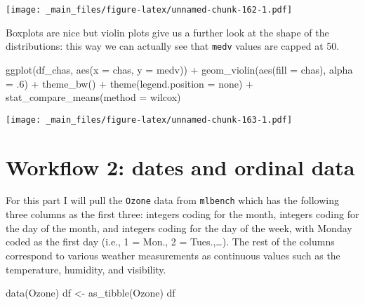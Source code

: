 \documentclass[
]{book}
\newenvironment{Shaded}{\begin{snugshade}}{\end{snugshade}}
\newcommand{\AttributeTok}[1]{\textcolor[rgb]{0.77,0.63,0.00}{#1}}
\newcommand{\DecValTok}[1]{\textcolor[rgb]{0.00,0.00,0.81}{#1}}
\newcommand{\FunctionTok}[1]{\textcolor[rgb]{0.00,0.00,0.00}{#1}}
\newcommand{\NormalTok}[1]{#1}
\newcommand{\OtherTok}[1]{\textcolor[rgb]{0.56,0.35,0.01}{#1}}
\newcommand{\SpecialCharTok}[1]{\textcolor[rgb]{0.00,0.00,0.00}{#1}}
\newcommand{\StringTok}[1]{\textcolor[rgb]{0.31,0.60,0.02}{#1}}
\begin{document}
\texttt{[image: \_main\_files/figure-latex/unnamed-chunk-162-1.pdf]}

Boxplots are nice but violin plots give us a further look at the shape of the distributions: this way we can actually see that \texttt{medv} values are capped at 50.

\begin{Shaded}
\begin{Highlighting}[]
\FunctionTok{ggplot}\NormalTok{(df\_chas, }\FunctionTok{aes}\NormalTok{(}\AttributeTok{x =}\NormalTok{ chas, }\AttributeTok{y =}\NormalTok{ medv)) }\SpecialCharTok{+}
  \FunctionTok{geom\_violin}\NormalTok{(}\FunctionTok{aes}\NormalTok{(}\AttributeTok{fill =}\NormalTok{ chas), }\AttributeTok{alpha =}\NormalTok{ .}\DecValTok{6}\NormalTok{) }\SpecialCharTok{+} 
  \FunctionTok{theme\_bw}\NormalTok{() }\SpecialCharTok{+} \FunctionTok{theme}\NormalTok{(}\AttributeTok{legend.position =} \StringTok{\textquotesingle{}none\textquotesingle{}}\NormalTok{) }\SpecialCharTok{+}
  \FunctionTok{stat\_compare\_means}\NormalTok{(}\AttributeTok{method =} \StringTok{\textquotesingle{}wilcox\textquotesingle{}}\NormalTok{)}
\end{Highlighting}
\end{Shaded}

\texttt{[image: \_main\_files/figure-latex/unnamed-chunk-163-1.pdf]}

\hypertarget{workflow-2-dates-and-ordinal-data}{%
\section{Workflow 2: dates and ordinal data}\label{workflow-2-dates-and-ordinal-data}}

For this part I will pull the \texttt{Ozone} data from \texttt{mlbench} which has the following three columns as the first three: integers coding for the month, integers coding for the day of the month, and integers coding for the day of the week, with Monday coded as the first day (i.e., 1 = Mon., 2 = Tues.,\ldots). The rest of the columns correspond to various weather measurements as continuous values such as the temperature, humidity, and visibility.

\begin{Shaded}
\begin{Highlighting}[]
\FunctionTok{data}\NormalTok{(}\StringTok{\textquotesingle{}Ozone\textquotesingle{}}\NormalTok{)}
\NormalTok{df }\OtherTok{\textless{}{-}} \FunctionTok{as\_tibble}\NormalTok{(Ozone)}
\NormalTok{df}
\end{Highlighting}
\end{Shaded}
\end{document}
